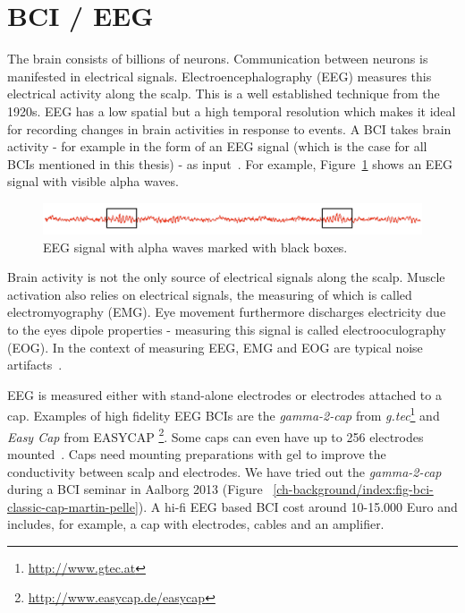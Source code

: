 \documentclass[a4paper,10pt,english,lof,lot,twoside]{puthesis}
\begin{document}
\section{BCI / EEG}
\label{ch-background/index:bci-eeg}
The brain consists of billions of neurons. Communication between neurons is
manifested in electrical signals. Electroencephalography (EEG) measures this
electrical activity along the scalp. This is a well established technique from
the 1920s. EEG has a low spatial but a high temporal resolution which makes it
ideal for recording changes in brain activities in response to events. A BCI
takes brain activity - for example in the form of an EEG signal (which is the
case for all BCIs mentioned in this thesis) - as input \cite{tong_quantitative_2009}. For example, Figure \ref{ch-background/index:fig-eeg-with-alpha-waves} shows an EEG signal with visible alpha waves.
\begin{figure}[tbp]
\centering
\capstart

\includegraphics[width=1.000\linewidth]{eeg_wave_with_alpha.png}
\caption[EEG with alpha waves]{EEG signal with alpha waves marked with black boxes.}\label{ch-background/index:fig-eeg-with-alpha-waves}\end{figure}

Brain activity is not the only source of electrical signals along the
scalp. Muscle activation also relies on electrical signals, the measuring of
which is called electromyography (EMG). Eye movement furthermore discharges
electricity due to the eyes dipole properties - measuring this signal is called
electrooculography (EOG). In the context of measuring EEG, EMG and EOG are
typical noise artifacts \cite{majumdar_human_2011}.

EEG is measured either with stand-alone electrodes or electrodes attached to a
cap. Examples of high fidelity EEG BCIs are the \emph{gamma-2-cap} from \emph{g.tec}\footnote{
\href{http://www.gtec.at}{http://www.gtec.at}
} and \emph{Easy Cap} from EASYCAP
\footnote{
\href{http://www.easycap.de/easycap}{http://www.easycap.de/easycap}
}. Some caps can even have up to 256 electrodes
mounted \cite{tong_quantitative_2009}. Caps need mounting preparations
with gel to improve the conductivity between scalp and electrodes. We have tried
out the \emph{gamma-2-cap} during a BCI seminar in Aalborg 2013 (Figure 
\ref{ch-background/index:fig-bci-classic-cap-martin-pelle}). A hi-fi EEG based BCI cost around
10-15.000 Euro and includes, for example, a cap with electrodes, cables
and an amplifier.
\end{document}
